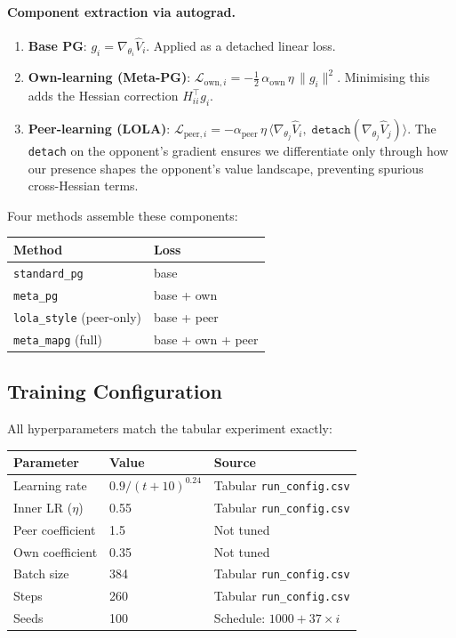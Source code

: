 \documentclass[11pt,a4paper]{article}
\begin{document}
\paragraph{Component extraction via autograd.}
\begin{enumerate}[nosep]
  \item \textbf{Base PG}: $g_i = \nabla_{\theta_i}\hat{V}_i$. Applied as a detached linear loss.
  \item \textbf{Own-learning (Meta-PG)}: $\mathcal{L}_{\text{own},i} = -\tfrac{1}{2}\,\alpha_{\text{own}}\,\eta\,\|g_i\|^2$. Minimising this adds the Hessian correction $H_{ii}^\top g_i$.
  \item \textbf{Peer-learning (LOLA)}: $\mathcal{L}_{\text{peer},i} = -\alpha_{\text{peer}}\,\eta\,\langle\nabla_{\theta_j}\hat{V}_i,\;\texttt{detach}(\nabla_{\theta_j}\hat{V}_j)\rangle$.
  The \texttt{detach} on the opponent's gradient ensures we differentiate only through how our presence shapes the opponent's value landscape, preventing spurious cross-Hessian terms.
\end{enumerate}

Four methods assemble these components:
\begin{center}
\begin{tabular}{ll}
\toprule
Method & Loss \\
\midrule
\texttt{standard\_pg} & base \\
\texttt{meta\_pg} & base + own \\
\texttt{lola\_style} (peer-only) & base + peer \\
\texttt{meta\_mapg} (full) & base + own + peer \\
\bottomrule
\end{tabular}
\end{center}

\subsection{Training Configuration}

All hyperparameters match the tabular experiment exactly:
\begin{center}
\begin{tabular}{lll}
\toprule
Parameter & Value & Source \\
\midrule
Learning rate & $0.9 / (t + 10)^{0.24}$ & Tabular \texttt{run\_config.csv} \\
Inner LR ($\eta$) & 0.55 & Tabular \texttt{run\_config.csv} \\
Peer coefficient & 1.5 & Not tuned \\
Own coefficient & 0.35 & Not tuned \\
Batch size & 384 & Tabular \texttt{run\_config.csv} \\
Steps & 260 & Tabular \texttt{run\_config.csv} \\
Seeds & 100 & Schedule: $1000 + 37 \times i$ \\
\bottomrule
\end{tabular}
\end{center}
\end{document}
